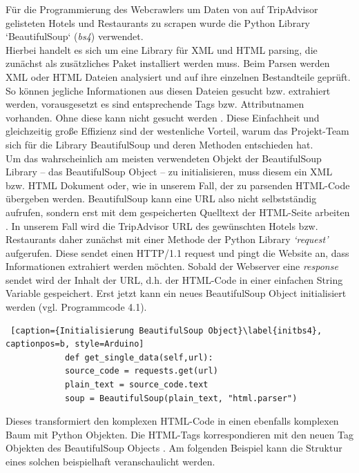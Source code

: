 \documentclass[a4paper,oneside,12pt]{report}
\begin{document}
			Für die Programmierung des Webcrawlers um Daten von auf TripAdvisor gelisteten Hotels und Restaurants zu scrapen wurde die Python Library ‘BeautifulSoup‘ (\textit{bs4}) verwendet.
			\\
			\newline
			Hierbei handelt es sich um eine Library für XML und HTML parsing, die zunächst als zusätzliches Paket installiert werden muss. Beim Parsen werden XML oder HTML Dateien analysiert und auf ihre einzelnen Bestandteile geprüft. So können jegliche Informationen aus diesen Dateien gesucht bzw. extrahiert werden, vorausgesetzt es sind entsprechende Tags bzw. Attributnamen vorhanden. Ohne diese kann nicht gesucht werden \cite{bib-webpython}. Diese Einfachheit und gleichzeitig große Effizienz sind der westenliche Vorteil, warum das Projekt-Team sich für die Library BeautifulSoup und deren Methoden entschieden hat.
			\\
			\newline
			Um das wahrscheinlich am meisten verwendeten Objekt der BeautifulSoup Library – das BeautifulSoup Object – zu initialisieren, muss diesem ein XML bzw. HTML Dokument oder, wie in unserem Fall, der zu parsenden HTML-Code übergeben werden. BeautifulSoup kann eine URL also nicht selbstständig aufrufen, sondern erst mit dem gespeicherten Quelltext der HTML-Seite arbeiten \cite{bib-bs4}. In unserem Fall wird die TripAdvisor URL des gewünschten Hotels bzw. Restaurants daher zunächst mit einer Methode der Python Library \textit{‘request'} aufgerufen. Diese sendet einen HTTP/1.1 request und pingt die Website an, dass Informationen extrahiert werden möchten. Sobald der Webserver eine \textit{response} sendet wird der Inhalt der URL, d.h. der HTML-Code in einer einfachen String Variable gespeichert. Erst jetzt kann ein neues BeautifulSoup Object initialisiert werden (vgl. Programmcode 4.1).
			\\ 
			\begin{lstlisting} [caption={Initialisierung BeautifulSoup Object}\label{initbs4}, captionpos=b, style=Arduino]
			def get_single_data(self,url):
			source_code = requests.get(url)
			plain_text = source_code.text
			soup = BeautifulSoup(plain_text, "html.parser")
			\end{lstlisting}
			
			Dieses transformiert den komplexen HTML-Code in einen ebenfalls komplexen Baum mit Python Objekten. Die HTML-Tags korrespondieren mit den neuen Tag Objekten des BeautifulSoup Objects \cite{bib-bs4}. Am folgenden Beispiel kann die Struktur eines solchen beispielhaft veranschaulicht werden.
			
\end{document}
